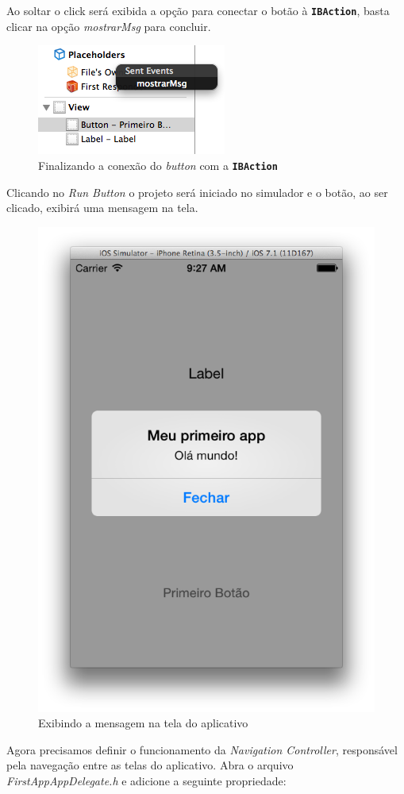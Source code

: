 \documentclass[a4paper,12pt,brazil,doubleside]{book}
\begin{document}
\begin{singlespace}
Ao soltar o click será exibida a opção para conectar o botão à \texttt{\textbf{IBAction}}, basta clicar na opção \emph{mostrarMsg} para concluir.

\begin{figure}[H]
  \centering
  \includegraphics[scale=1]{figuras/3/tela_novo_projeto_24.png}
  \caption{Finalizando a conexão do \emph{button} com a \texttt{\textbf{IBAction}}}
  \label{fig:a}
\end{figure}


Clicando no \emph{Run Button} o projeto será iniciado no simulador e o botão, ao ser clicado, exibirá uma mensagem na tela.

\begin{figure}[H]
  \centering
  \includegraphics[width=.55\textwidth]{figuras/3/tela_novo_projeto_25.png}
  \caption{Exibindo a mensagem na tela do aplicativo}
  \label{fig:a}
\end{figure}


Agora precisamos definir o funcionamento da \emph{Navigation Controller}, responsável pela navegação entre as telas do aplicativo. Abra o arquivo \emph{FirstAppAppDelegate.h} e adicione a seguinte propriedade:


\end{singlespace}
\end{document}
